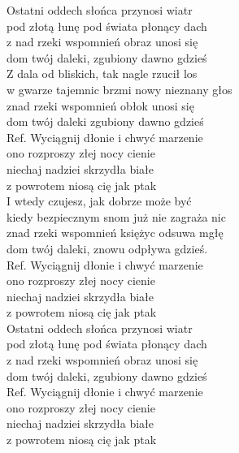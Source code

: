 
Ostatni oddech słońca przynosi wiatr  \\
pod złotą łunę pod świata płonący dach  \\
z nad rzeki wspomnień obraz unosi się  \\
dom twój daleki, zgubiony dawno gdzieś  \\
\hops
Z dala od bliskich, tak nagle rzucił los  \\
w gwarze tajemnic brzmi nowy nieznany głos  \\
znad rzeki wspomnień obłok unosi się  \\
dom twój daleki zgubiony dawno gdzieś  \\
\hops
Ref. Wyciągnij dłonie i chwyć marzenie  \\
 ono rozproszy złej nocy cienie  \\
 niechaj nadziei skrzydła białe  \\
 z powrotem niosą cię jak ptak  \\
\hops
I wtedy czujesz, jak dobrze może być  \\
kiedy bezpiecznym snom już nie zagraża nic  \\
znad rzeki wspomnień księżyc odsuwa mgłę  \\
dom twój daleki, znowu odpływa gdzieś. \\
\hops
Ref. Wyciągnij dłonie i chwyć marzenie  \\
 ono rozproszy złej nocy cienie  \\
 niechaj nadziei skrzydła białe  \\
 z powrotem niosą cię jak ptak \\
\hops
Ostatni oddech słońca przynosi wiatr  \\
pod złotą łunę pod świata płonący dach  \\
z nad rzeki wspomnień obraz unosi się  \\
dom twój daleki, zgubiony dawno gdzieś  \\
\hops
Ref. Wyciągnij dłonie i chwyć marzenie  \\
 ono rozproszy złej nocy cienie  \\
 niechaj nadziei skrzydła białe  \\
 z powrotem niosą cię jak ptak 